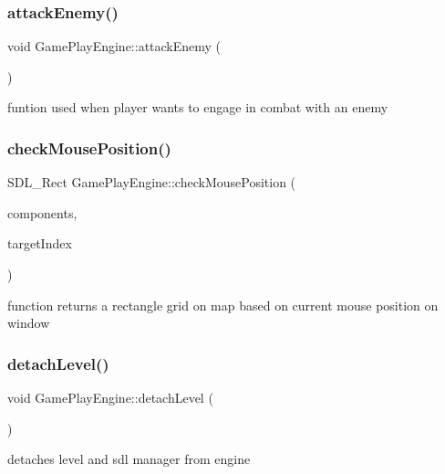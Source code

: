 \subsubsection{\texorpdfstring{attack\+Enemy()}{attackEnemy()}}
{\footnotesize\ttfamily void Game\+Play\+Engine\+::attack\+Enemy (\begin{DoxyParamCaption}{ }\end{DoxyParamCaption})}

funtion used when player wants to engage in combat with an enemy \hypertarget{class_game_play_engine_a2cbd6100775c2a55b46c4f3a29d166b1}{}\label{class_game_play_engine_a2cbd6100775c2a55b46c4f3a29d166b1} 
\subsubsection{\texorpdfstring{check\+Mouse\+Position()}{checkMousePosition()}}
{\footnotesize\ttfamily S\+D\+L\+\_\+\+Rect Game\+Play\+Engine\+::check\+Mouse\+Position (\begin{DoxyParamCaption}\item[{std\+::vector$<$ S\+D\+L\+\_\+\+Rect $>$}]{components,  }\item[{int $\ast$}]{target\+Index }\end{DoxyParamCaption})}

function returns a rectangle grid on map based on current mouse position on window \hypertarget{class_game_play_engine_a2b5f4dc886288daecaa2be9b9a8ca287}{}\label{class_game_play_engine_a2b5f4dc886288daecaa2be9b9a8ca287} 
\subsubsection{\texorpdfstring{detach\+Level()}{detachLevel()}}
{\footnotesize\ttfamily void Game\+Play\+Engine\+::detach\+Level (\begin{DoxyParamCaption}{ }\end{DoxyParamCaption})}

detaches level and sdl manager from engine \hypertarget{class_game_play_engine_a2a0f5663a43825bbd815d6bfe92bd8fb}{}\label{class_game_play_engine_a2a0f5663a43825bbd815d6bfe92bd8fb} 
